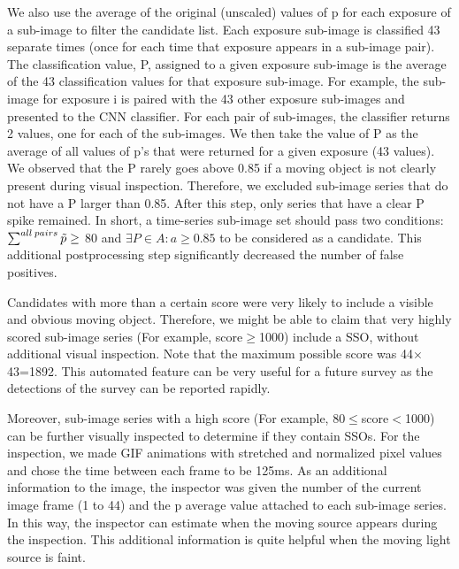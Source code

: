 \documentclass{aastex631}
\begin{document}
We also use the average of the original (unscaled) values of p for each exposure of a sub-image to filter the candidate list.
Each exposure sub-image is classified 43 separate times (once for each time that exposure appears in a sub-image pair).
The classification value, P, assigned to a given exposure sub-image is the average of the 43 classification values for that exposure sub-image.
For example, the sub-image for exposure i is paired with the 43 other exposure sub-images and presented to the CNN classifier.  
For each pair of sub-images, the classifier returns 2 values, one for each of the sub-images.  
We then take the value of P as the average of all values of p's that were returned for a given exposure (43 values). 
We observed that the P rarely goes above 0.85 if a moving object is not clearly present during visual inspection.
Therefore, we excluded sub-image series that do not have a P larger than 0.85.
After this step, only series that have a clear P spike remained.
In short, a time-series sub-image set should pass two conditions: $\sum^{all\:pairs}\Tilde{p}\geq$ 80 and $\exists P \in A : a \geq 0.85$ to be considered as a candidate.
This additional postprocessing step significantly decreased the number of false positives.


Candidates with more than a certain score were very likely to include a visible and obvious moving object.
Therefore, we might be able to claim that very highly scored sub-image series (For example, score$\geq$1000) include a SSO, without additional visual inspection.
Note that the maximum possible score was 44$\times$43=1892.
This automated feature can be very useful for a future survey as the detections of the survey can be reported rapidly.

Moreover, sub-image series with a high score (For example, 80$\leq$score$<$1000) can be further visually inspected to determine if they contain SSOs.
For the inspection, we made GIF animations with stretched and normalized pixel values and chose the time between each frame to be 125ms.
As an additional information to the image, the inspector was given the number of the current image frame (1 to 44) and the p average value attached to each sub-image series.
In this way, the inspector can estimate when the moving source appears during the inspection.
This additional information is quite helpful when the moving light source is faint.
\end{document}
